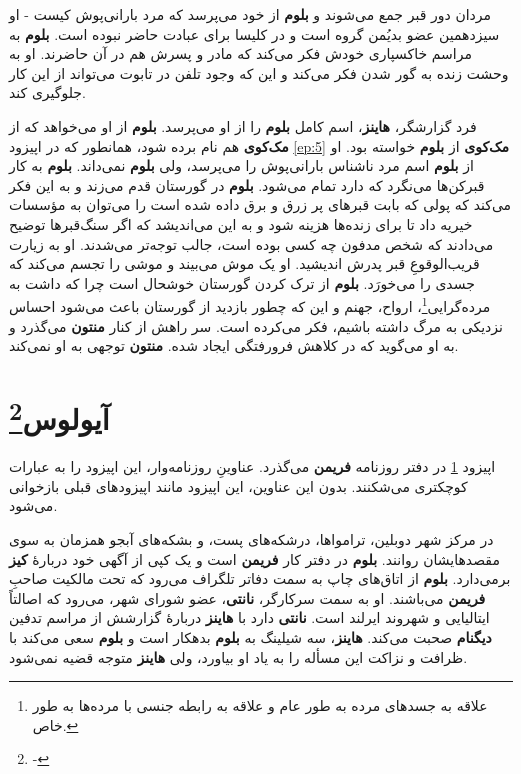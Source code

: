 \documentclass[12pt]{book}
\newcommand{\noun}[1]{{\textbf{#1}}}
\begin{document}
    مردان دور قبر جمع می‌شوند و \noun{بلوم} از خود می‌پرسد که مرد بارانی‌پوش کیست - او سیزدهمین عضو بدیُمن گروه است و در کلیسا برای عبادت حاضر نبوده است. \noun{بلوم} به مراسم خاکسپاری خودش فکر می‌کند که مادر و پسرش هم در آن حاضرند. او به وحشت زنده به گور شدن فکر می‌کند و این که وجود تلفن در تابوت می‌تواند از این کار جلوگیری کند.

    فرد گزارشگر، \noun{هاینز}، اسم کامل \noun{بلوم} را از او می‌پرسد. \noun{بلوم} از او می‌خواهد که از \noun{مک‌کوی} هم نام برده شود، همانطور که در اپیزود \ref{ep:5} \noun{مک‌کوی} از \noun{بلوم} خواسته بود. او از \noun{بلوم} اسم مرد ناشناس بارانی‌پوش را می‌پرسد، ولی \noun{بلوم} نمی‌داند. \noun{بلوم} به کار قبرکن‌ها می‌نگرد که دارد تمام می‌شود. \noun{بلوم} در گورستان قدم می‌زند و به این فکر می‌کند که پولی که بابت قبرهای پر زرق و برق داده شده است را می‌توان به مؤسسات خیریه داد تا برای زنده‌ها هزینه شود و به این می‌اندیشد که اگر سنگ‌قبرها توضیح می‌دادند که شخص مدفون چه کسی بوده است، جالب توجه‌تر می‌شدند. او به زیارت قریب‌الوقوعِ قبر پدرش اندیشید. او یک موش می‌بیند و موشی را تجسم می‌کند که جسدی را می‌خورَد. \noun{بلوم} از ترک کردن گورستان خوشحال است چرا که داشت به مرده‌گرایی\footnote{علاقه به جسدهای مرده به طور عام و علاقه به رابطه جنسی با مرده‌ها به طور خاص.}، ارواح، جهنم و این که چطور بازدید از گورستان باعث می‌شود احساس نزدیکی به مرگ داشته باشیم، فکر می‌کرده است. سر راهش از کنار \noun{منتون} می‌گذرد و به او می‌گوید که در کلاهش فرورفتگی ایجاد شده. \noun{منتون} توجهی به او نمی‌کند.

    \chapter[آیولوس]{آیولوس\protect\footnote{-}}\label{ep:7}
    اپیزود \ref{ep:7} در دفتر روزنامه \noun{فریمن} می‌گذرد. عناوینِ روزنامه‌وار، این اپیزود را به عبارات کوچکتری می‌شکنند. بدون این عناوین، این اپیزود مانند اپیزودهای قبلی بازخوانی می‌شود.

    در مرکز شهر دوبلین، ترامواها، درشکه‌های پست، و بشکه‌های آبجو همزمان به سوی مقصدهایشان روانند. \noun{بلوم} در دفتر کار \noun{فریمن} است و یک کپی از آگهی خود دربارهٔ \noun{کیز} برمی‌دارد. \noun{بلوم} از اتاق‌های چاپ به سمت دفاتر تلگراف می‌رود که تحت مالکیت صاحبِ \noun{فریمن} می‌باشند. او به سمت سرکارگر، \noun{نانتی}، عضو شورای شهر، می‌رود که اصالتاً ایتالیایی و شهروند ایرلند است. \noun{نانتی} دارد با \noun{هاینز} دربارهٔ گزارشش از مراسم تدفین \noun{دیگنام} صحبت می‌کند. \noun{هاینز}، سه شیلینگ به \noun{بلوم} بدهکار است و \noun{بلوم} سعی می‌کند با ظرافت و نزاکت این مسأله را به یاد او بیاورد، ولی \noun{هاینز} متوجه قضیه نمی‌شود.
\end{document}
